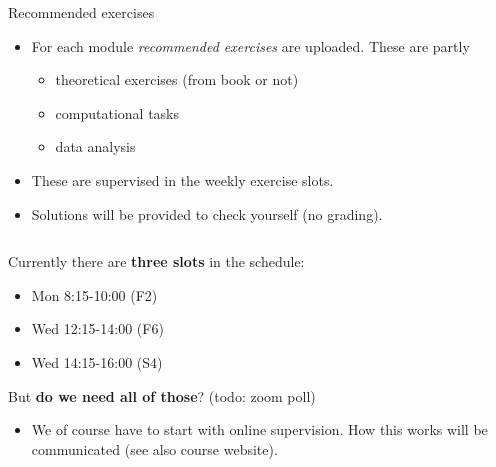 \documentclass[10pt,ignorenonframetext,]{beamer}
\providecommand{\tightlist}{%
  \setlength{\itemsep}{0pt}\setlength{\parskip}{0pt}}
\begin{document}
\begin{frame}

\begin{block}{Recommended exercises}

\vspace{2mm}

\begin{itemize}
\tightlist
\item
  For each module \emph{recommended exercises} are uploaded. These are
  partly

  \begin{itemize}
  \tightlist
  \item
    theoretical exercises (from book or not)
  \item
    computational tasks
  \item
    data analysis
  \end{itemize}
\end{itemize}

\vspace{2mm}

\begin{itemize}
\tightlist
\item
  These are supervised in the weekly exercise slots.
\end{itemize}

\vspace{2mm}

\begin{itemize}
\tightlist
\item
  Solutions will be provided to check yourself (no grading).
\end{itemize}

\(~\)

Currently there are \textbf{three slots} in the schedule:

\begin{itemize}
\tightlist
\item
  Mon 8:15-10:00 (F2)
\item
  Wed 12:15-14:00 (F6)
\item
  Wed 14:15-16:00 (S4)
\end{itemize}

\vspace{2mm}

But \textbf{do we need all of those}? (todo: zoom poll)

\vspace{2mm}

\begin{itemize}
\tightlist
\item
  We of course have to start with online supervision. How this works
  will be communicated (see also course website).
\end{itemize}

\end{block}

\end{frame}
\end{document}
